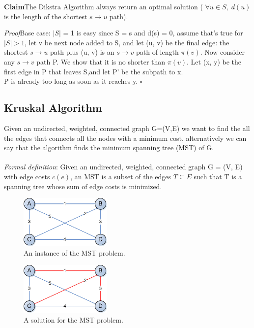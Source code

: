 \documentclass[11pt]{article}
\newenvironment{claim}[1]{\par\textbf{Claim}\space#1}{}
\newenvironment{proof}[1]{\par\textit{Proof}\space#1}{\hfill\ensuremath{\square}}
\begin{document}
\begin{claim}
The Dikstra Algorithm always return an optimal solution ( $\forall u \in S, \; d(u)$ is the length of the shortest $s\rightarrow u$ path).
\end{claim}
\begin{proof}
Base case: $| S |$ = 1 is easy since S = { s } and d(s) = 0, assume that's true for $| S | > 1$, let v be next node added to S, and let (u, v) be the final edge: the shortest $s\rightarrow u$ path plus (u, v) is an $s\rightarrow v$ path of length $π(v)$. Now consider any $s\rightarrow v$ path P. We show that it is no shorter than $π(v)$. Let (x, y) be the first edge in P that leaves S,and let P' be the subpath to x.\\
P is already too long as soon as it reaches y.
\end{proof}\\

\subsection{Kruskal Algorithm}
Given an undirected, weighted, connected graph G=(V,E) we want to find the all the edges that connects all the nodes with a minimum cost, alternatively we can say that the algorithm finds the minimum spanning tree (MST) of G.\\\\
\emph{Formal definition}: Given an undirected, weighted, connected  graph G = (V, E) with edge costs $c(e)$, an MST is a subset of the edges $T \subseteq E$ such that T is a spanning tree whose sum of edge costs is minimized.

\begin{figure}[H]
		\centering
		\includegraphics[width=0.4\textwidth ]{kruskal}
		\caption{An instance of the MST problem.}
\end{figure}

\begin{figure}[H]
		\centering
		\includegraphics[width=0.4\textwidth ]{kruskal_solved}
		\caption{A solution for the MST problem.}
\end{figure}
\end{document}
